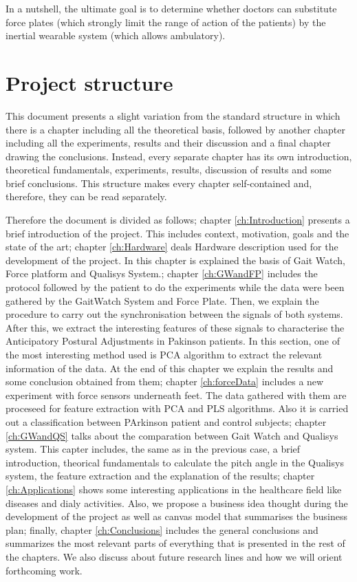 In a nutshell, the ultimate goal is to determine whether doctors can substitute force plates (which strongly limit the range of action of the patients) by the inertial wearable system (which allows ambulatory).


\section{Project structure}
This document presents a slight variation from the standard structure in which there is a chapter including all the theoretical basis, followed by another chapter including all the experiments, results and their discussion and a final chapter drawing the conclusions. Instead, every separate chapter has its own introduction, theoretical fundamentals, experiments, results, discussion of results and some brief conclusions. This structure makes every chapter self-contained and, therefore, they can be read separately.
 
Therefore the document is divided as follows; chapter \ref{ch:Introduction} presents a brief introduction of the project. This includes  context, motivation, goals and the state of the art; chapter \ref{ch:Hardware} deals Hardware description used for the development of the project. In this chapter is explained the basis of Gait Watch, Force platform and Qualisys System.; chapter \ref{ch:GWandFP} includes the protocol followed by the patient to do the experiments while the data were been gathered by the GaitWatch System and Force Plate. Then, we explain the procedure to carry out the synchronisation between the signals of both systems. After this, we extract the interesting features of these signals to characterise the Anticipatory Postural Adjustments in Pakinson patients. In this section, one of the most interesting method used is PCA algorithm to extract the relevant information of the data. At the end of this chapter we explain the results and some conclusion obtained from them; chapter \ref{ch:forceData} includes a new experiment with force sensors underneath feet. The data gathered with them are proceseed for feature extraction with PCA and PLS algorithms. Also it is carried out a classification between PArkinson patient and control subjects; chapter \ref{ch:GWandQS} talks about the comparation between Gait Watch and Qualisys system. This capter includes, the same as in the previous case, a brief introduction, theorical fundamentals to calculate the pitch angle in the Qualisys system, the feature extraction and the explanation of the results; chapter \ref{ch:Applications} shows some interesting applications in the healthcare field  like diseases and dialy activities. Also, we propose a business idea thought during the development of the project as well as canvas model that summarises the business plan; finally, chapter \ref{ch:Conclusions} includes the general conclusions and summarizes the most relevant parts of everything that is presented in the rest of the chapters. We also discuss about future research lines and how we will orient forthcoming work.

